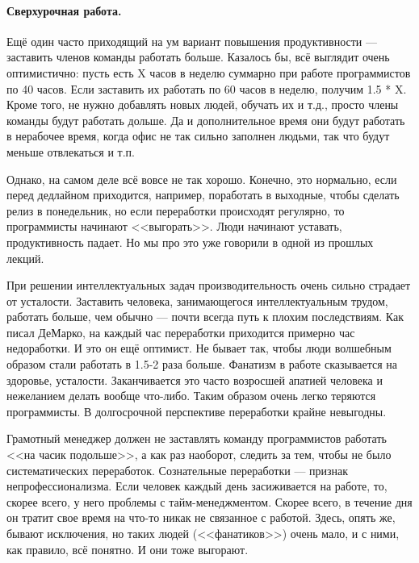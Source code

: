 \documentclass{../../text-style}
\begin{document}
\paragraph{Сверхурочная работа.} Ещё один часто приходящий на ум вариант повышения продуктивности --- заставить членов команды работать больше. Казалось бы, всё выглядит очень оптимистично: пусть есть X часов в неделю суммарно при работе программистов по 40 часов. Если заставить их работать по 60 часов в неделю, получим 1.5 * X. Кроме того, не нужно добавлять новых людей, обучать их и т.д., просто члены команды будут работать дольше. Да и дополнительное время они будут работать в нерабочее время, когда офис не так сильно заполнен людьми, так что будут меньше отвлекаться и т.п.

Однако, на самом деле всё вовсе не так хорошо. Конечно, это нормально, если перед дедлайном приходится, например, поработать в выходные, чтобы сделать релиз в понедельник, но если переработки происходят регулярно, то программисты начинают <<выгорать>>. Люди начинают уставать, продуктивность падает. Но мы про это уже говорили в одной из прошлых лекций.

При решении интеллектуальных задач производительность очень сильно страдает от усталости. Заставить человека, занимающегося интеллектуальным трудом, работать больше, чем обычно --- почти всегда путь к плохим последствиям. Как писал ДеМарко, на каждый час переработки приходится примерно час недоработки. И это он ещё оптимист. Не бывает так, чтобы люди волшебным образом стали работать в 1.5-2 раза больше. Фанатизм в работе сказывается на здоровье, усталости. Заканчивается это часто возросшей апатией человека и нежеланием делать вообще что-либо. Таким образом очень легко теряются программисты. В долгосрочной перспективе переработки крайне невыгодны.

Грамотный менеджер должен не заставлять команду программистов работать <<на часик подольше>>, а как раз наоборот, следить за тем, чтобы не было систематических переработок. Сознательные переработки --- признак непрофессионализма. Если человек каждый день засиживается на работе, то, скорее всего, у него проблемы с тайм-менеджментом. Скорее всего, в течение дня он тратит свое время на что-то никак не связанное с работой. Здесь, опять же, бывают исключения, но таких людей (<<фанатиков>>) очень мало, и с ними, как правило, всё понятно. И они тоже выгорают.
\end{document}
